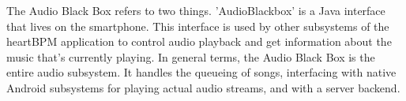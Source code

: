 The Audio Black Box refers to two things. 'AudioBlackbox' is a Java interface that lives on the smartphone. This interface is used by other subsystems of the heartBPM application to control audio playback and get information about the music that's currently playing. In general terms, the Audio Black Box is the entire audio subsystem. It handles the queueing of songs, interfacing with native Android subsystems for playing actual audio streams, and with a server backend.
